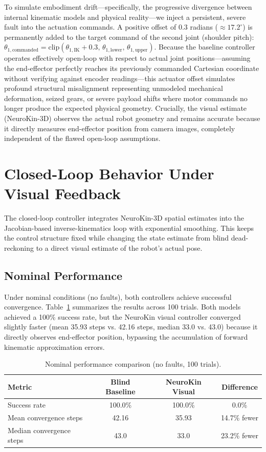\documentclass[12pt,a4paper,oneside]{report}
\begin{document}
To simulate embodiment drift—specifically, the progressive divergence between internal kinematic models and physical reality—we inject a persistent, severe fault into the actuation commands. A positive offset of 0.3 radians ($\approx 17.2^\circ$) is permanently added to the target command of the second joint (shoulder pitch): $\theta_{1,\text{commanded}} = \text{clip}(\theta_{1,\text{IK}} + 0.3, \, \theta_{1,\text{lower}}, \, \theta_{1,\text{upper}})$. Because the baseline controller operates effectively open-loop with respect to actual joint positions—assuming the end-effector perfectly reaches its previously commanded Cartesian coordinate without verifying against encoder readings—this actuator offset simulates profound structural misalignment representing unmodeled mechanical deformation, seized gears, or severe payload shifts where motor commands no longer produce the expected physical geometry. Crucially, the visual estimate (NeuroKin-3D) observes the actual robot geometry and remains accurate because it directly measures end-effector position from camera images, completely independent of the flawed open-loop assumptions.

\section{Closed-Loop Behavior Under Visual Feedback}

The closed-loop controller integrates NeuroKin-3D spatial estimates into the Jacobian-based inverse-kinematics loop with exponential smoothing. This keeps the control structure fixed while changing the state estimate from blind dead-reckoning to a direct visual estimate of the robot's actual pose.

\subsection{Nominal Performance}
\label{subsec:nominal_performance}

Under nominal conditions (no faults), both controllers achieve successful convergence. Table~\ref{tab:nominal_performance} summarizes the results across 100 trials. Both models achieved a 100\% success rate, but the NeuroKin visual controller converged slightly faster (mean 35.93 steps vs. 42.16 steps, median 33.0 vs. 43.0) because it directly observes end-effector position, bypassing the accumulation of forward kinematic approximation errors.

\begin{table}[H]
\centering
\caption{Nominal performance comparison (no faults, 100 trials).}
\label{tab:nominal_performance}
\begin{tabular}{lccc}
\toprule
\textbf{Metric} & \textbf{Blind Baseline} & \textbf{NeuroKin Visual} & \textbf{Difference} \\
\midrule
Success rate & 100.0\% & 100.0\% & 0.0\% \\
Mean convergence steps & 42.16 & 35.93 & 14.7\% fewer \\
Median convergence steps & 43.0 & 33.0 & 23.2\% fewer \\
\bottomrule
\end{tabular}
\end{table}
\end{document}

